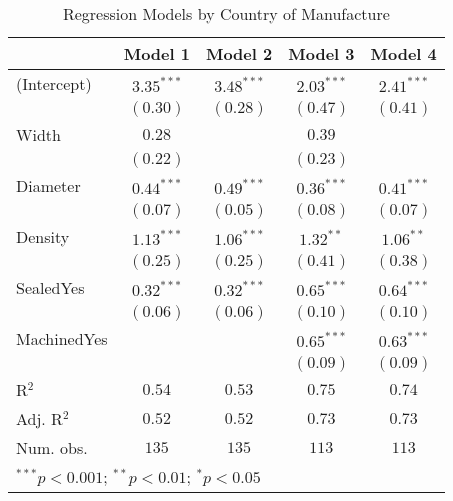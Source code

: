 
\begin{table}
\begin{center}
\begin{tabular}{l c c c c}
\hline
 & Model 1 & Model 2 & Model 3 & Model 4 \\
\hline
(Intercept) & $3.35^{***}$ & $3.48^{***}$ & $2.03^{***}$ & $2.41^{***}$ \\
            & $(0.30)$     & $(0.28)$     & $(0.47)$     & $(0.41)$     \\
Width       & $0.28$       &              & $0.39$       &              \\
            & $(0.22)$     &              & $(0.23)$     &              \\
Diameter    & $0.44^{***}$ & $0.49^{***}$ & $0.36^{***}$ & $0.41^{***}$ \\
            & $(0.07)$     & $(0.05)$     & $(0.08)$     & $(0.07)$     \\
Density     & $1.13^{***}$ & $1.06^{***}$ & $1.32^{**}$  & $1.06^{**}$  \\
            & $(0.25)$     & $(0.25)$     & $(0.41)$     & $(0.38)$     \\
SealedYes   & $0.32^{***}$ & $0.32^{***}$ & $0.65^{***}$ & $0.64^{***}$ \\
            & $(0.06)$     & $(0.06)$     & $(0.10)$     & $(0.10)$     \\
MachinedYes &              &              & $0.65^{***}$ & $0.63^{***}$ \\
            &              &              & $(0.09)$     & $(0.09)$     \\
\hline
R$^2$       & $0.54$       & $0.53$       & $0.75$       & $0.74$       \\
Adj. R$^2$  & $0.52$       & $0.52$       & $0.73$       & $0.73$       \\
Num. obs.   & $135$        & $135$        & $113$        & $113$        \\
\hline
\multicolumn{5}{l}{\scriptsize{$^{***}p<0.001$; $^{**}p<0.01$; $^{*}p<0.05$}}
\end{tabular}
\caption{Regression Models by Country of Manufacture}
\label{tab:reg_by_country}
\end{center}
\end{table}
